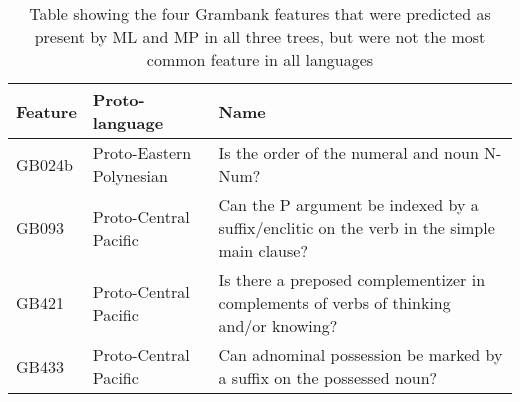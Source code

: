 \begin{table}[ht]
\centering
\begin{tabular}{p{2cm}p{4cm}p{8cm}}
  \toprule
\textbf{Feature} & \textbf{Proto-language} & \textbf{Name} \\ 
  \midrule
GB024b & Proto-Eastern Polynesian & Is the order of the numeral and noun N-Num? \\ 
  GB093 & Proto-Central Pacific & Can the P argument be indexed by a suffix/enclitic on the verb in the simple main clause? \\ 
  GB421 & Proto-Central Pacific & Is there a preposed complementizer in complements of verbs of thinking and/or knowing? \\ 
  GB433 & Proto-Central Pacific & Can adnominal possession be marked by a suffix on the possessed noun? \\ 
   \bottomrule
\end{tabular}
\caption{Table showing the four Grambank features that were predicted as present by ML and MP in all three trees, but were not the most common feature in all languages} 
\label{table_extra_predictions_four}
\end{table}
